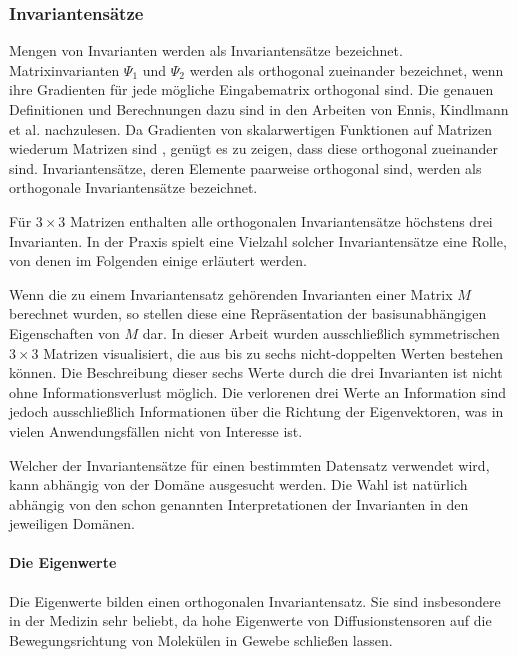 \documentclass[a4paper,fontsize=12pt,toc=bib,parskip=half,ngerman]{scrartcl}
\begin{document}
\subsubsection{Invariantens\"atze} 
\label{sec:Invariants}
Mengen von Invarianten werden als Invariantens\"atze bezeichnet.
Matrixinvarianten $\Psi_1$ und $\Psi_2$ werden als orthogonal zueinander bezeichnet, wenn ihre Gradienten f\"ur jede m\"ogliche Eingabematrix orthogonal sind. Die genauen Definitionen und Berechnungen dazu sind in den Arbeiten von Ennis, Kindlmann et al. \cite{ennis2006orthogonal} nachzulesen. Da Gradienten von skalarwertigen Funktionen auf Matrizen wiederum Matrizen sind \cite[S.~137]{ennis2006orthogonal}, gen\"ugt es zu zeigen, dass diese orthogonal zueinander sind. Invariantens\"atze, deren Elemente paarweise orthogonal sind, werden als orthogonale Invariantens\"atze bezeichnet.

F\"ur $3\times 3$ Matrizen enthalten alle orthogonalen Invariantens\"atze h\"ochstens drei Invarianten. In der Praxis spielt eine Vielzahl solcher Invariantens\"atze eine Rolle, von denen im Folgenden einige erl\"autert werden.

Wenn die zu einem Invariantensatz geh\"orenden Invarianten einer Matrix $M$ berechnet wurden, so stellen diese eine Repr\"asentation der basisunabh\"angigen Eigenschaften von $M$ dar. In dieser Arbeit wurden ausschlie{\ss}lich symmetrischen $3\times3$ Matrizen visualisiert, die aus bis zu sechs nicht-doppelten Werten bestehen k\"onnen. Die Beschreibung dieser sechs Werte durch die drei Invarianten ist nicht ohne Informationsverlust m\"oglich. Die verlorenen drei Werte an Information sind jedoch ausschlie{\ss}lich Informationen \"uber die Richtung der Eigenvektoren, was in vielen Anwendungsf\"allen nicht von Interesse ist.

Welcher der Invariantens\"atze f\"ur einen bestimmten Datensatz verwendet wird, kann abh\"angig von der Dom\"ane ausgesucht werden. Die Wahl ist nat\"urlich abh\"angig von den schon genannten Interpretationen der Invarianten in den jeweiligen Dom\"anen.

\paragraph{Die Eigenwerte}

Die Eigenwerte bilden einen orthogonalen Invariantensatz. Sie sind insbesondere in der Medizin sehr beliebt, da hohe Eigenwerte von Diffusionstensoren auf die Bewegungsrichtung von Molek\"ulen in Gewebe schlie{\ss}en lassen.
\end{document}
